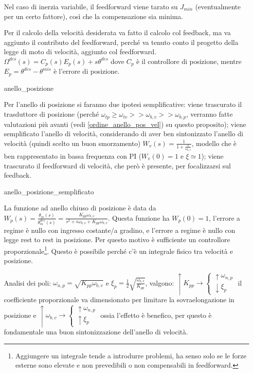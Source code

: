 Nel caso di inerzia variabile, il feedforward viene tarato su \(J_{min}\) (eventualmente per un certo fattore), così che la compensazione sia minima.


Per il calcolo della velocità desiderata va fatto il calcolo col feedback, ma va aggiunto il contributo del feedforward, perché va tenuto conto il progetto della legge di moto di velocità, aggiunto col feedforward.
\(\Omega^{des}(s) = C_p(s)E_p(s) + s\theta^{des}\) dove \(C_p\) è il controllore di posizione, mentre \(E_p = \theta^{des} - \theta^{mis}\) è l'errore di posizione.

{anello_posizione}

Per l'anello  di posizione si faranno due ipotesi semplificative: viene trascurato il trasduttore di posizione (perché \(\omega_{tp}\geqslant \omega_{tv} >> \omega_{b,v} >> \omega_{b,p}\), verranno fatte valutazioni più avanti (vedi \ref{ordine_anello_pos_vel}) su questo proposito); viene semplificato l'anello di velocità, considerando di aver ben sintonizzato l'anello di velocità (quindi scelto un buon smorzamento) \(W_v(s)=\frac{1}{1+\frac{s}{\omega_{b,v}}}\), modello che è ben rappresentato in bassa frequenza con PI (\(W_v(0)=1\) e \(\xi \simeq 1\)); viene trascurato il feedforward di velocità, che però è presente, per focalizzarsi sul feedback.

{anello_posizione_semplificato}

La funzione ad anello chiuso di posizione è data da \(W_p(s) = \frac{\theta_m(s)}{\theta_m^{des}(s)} = \frac{K_{pp}\omega_{b,v}}{s^2 + s \omega_{b,v} + K_{pp}\omega_{b,v}}\). Questa funzione ha \(W_p(0) = 1\), l'errore a regime è nullo con ingresso costante/a gradino, e l'errore a regime è nullo con legge rest to rest in posizione.
Per questo motivo è sufficiente un controllore proporzionale\footnote{Aggiungere un integrale tende a introdurre problemi, ha senso solo se le forze esterne sono elevate e non prevedibili o non compensabili in feedforward.}. Questo è possibile perché c'è un integrale fisico tra velocità e posizione.

Analisi dei poli: \(\omega_{n,p} = \sqrt{K_{pp} \omega_{b,v}}\) e \(\xi_p = \frac{1}{2}\sqrt{\frac{\omega_{b,v}}{K_{pp}}}\), valgono:
\( \uparrow K_{pp} \rightarrow \begin{cases}
    \uparrow \omega_{n,p} \\
    \downarrow \xi_p
\end{cases}
\) il coefficiente proporzionale va dimensionato per limitare la sovraelongazione in posizione e \( \uparrow \omega_{b,v} \rightarrow \begin{cases}
    \uparrow \omega_{n,p} \\
    \uparrow \xi_p
\end{cases}
\) ossia l'effetto è benefico, per questo è fondamentale una buon sintonizzazione dell'anello di velocità.

